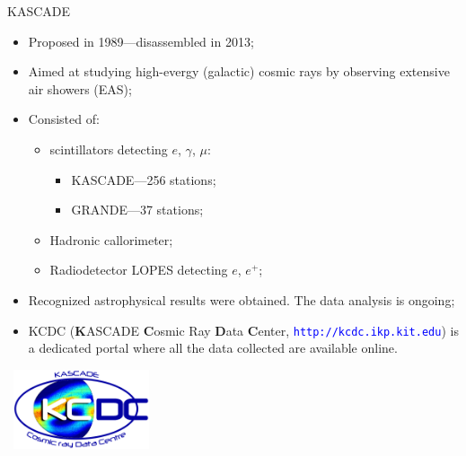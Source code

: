 \begin{frame}{KASCADE}
\begin{itemize}
  \item Proposed in 1989---disassembled in 2013;
  \item Aimed at studying
  high-evergy (galactic) cosmic rays by observing extensive air showers (EAS);
  \item Consisted of:
  \begin{itemize}
    \item scintillators detecting $e$, $\gamma$, $\mu$:
    \begin{itemize}
    \item KASCADE---256 stations;
    \item GRANDE---37 stations;
    \end{itemize}
    \item Hadronic callorimeter;
    \item Radiodetector LOPES detecting $e$, $e^{+}$;
  \end{itemize}
  \item Recognized astrophysical results were obtained. The data analysis is ongoing;
  \item KCDC (\textbf{K}ASCADE \textbf{C}osmic Ray \textbf{D}ata \textbf{C}enter, \textcolor{blue}{\texttt{http://kcdc.ikp.kit.edu}}) is a dedicated portal where all the data collected are available online. %
\end{itemize}

\parbox[t][0pt]{0pt}{
  \vspace{-0.63\textheight}
  ~\hspace{0.68\textwidth}\includegraphics[width=0.3\textwidth]{pics/KCDC-Logo.png}
}
\end{frame}

